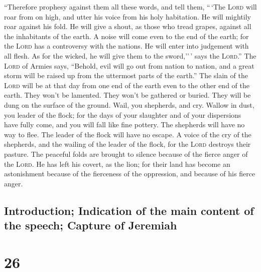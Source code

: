  ``Therefore prophesy against them all these words, and
tell them, ``\,`The \textsc{Lord} will roar from on high, and utter his
voice from his holy habitation. He will mightily roar against his fold.
He will give a shout, as those who tread grapes, against all the
inhabitants of the earth.  A noise will come even to the
end of the earth; for the \textsc{Lord} has a controversy with the
nations. He will enter into judgement with all flesh. As for the wicked,
he will give them to the sword,''\,' says the \textsc{Lord}.''
 The \textsc{Lord} of Armies says, ``Behold, evil will go
out from nation to nation, and a great storm will be raised up from the
uttermost parts of the earth.''  The slain of the
\textsc{Lord} will be at that day from one end of the earth even to the
other end of the earth. They won't be lamented. They won't be gathered
or buried. They will be dung on the surface of the ground.
 Wail, you shepherds, and cry. Wallow in dust, you leader
of the flock; for the days of your slaughter and of your dispersions
have fully come, and you will fall like fine pottery. 
The shepherds will have no way to flee. The leader of the flock will
have no escape.  A voice of the cry of the shepherds, and
the wailing of the leader of the flock, for the \textsc{Lord} destroys
their pasture.  The peaceful folds are brought to silence
because of the fierce anger of the \textsc{Lord}.  He has
left his covert, as the lion; for their land has become an astonishment
because of the fierceness of the oppression, and because of his fierce
anger.

\hypertarget{introduction-indication-of-the-main-content-of-the-speech-capture-of-jeremiah}{%
\subsection{Introduction; Indication of the main content of the speech;
Capture of
Jeremiah}\label{introduction-indication-of-the-main-content-of-the-speech-capture-of-jeremiah}}

\hypertarget{section-25}{%
\section{26}\label{section-25}}

